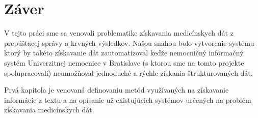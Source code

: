 \chapter*{Záver}  %





V tejto práci sme sa venovali problematike získavania medicínskych dát z prepúšťacej správy a krvných výsledkov. Našou snahou bolo vytvorenie systému ktorý by takéto získavanie dát zautomatizoval keďže nemocničný informačný systém Univerzitnej nemocnice v Bratislave (s ktorou sme na tomto projekte spolupracovali) neumožňoval jednoduché a rýchle získania štrukturovaných dát. 

Prvá kapitola je venovaná definovaniu metód využívaných na získavanie informácie z textu a na opísanie už existujúcich systémov určených na problém získavania medicínskych dát. 




